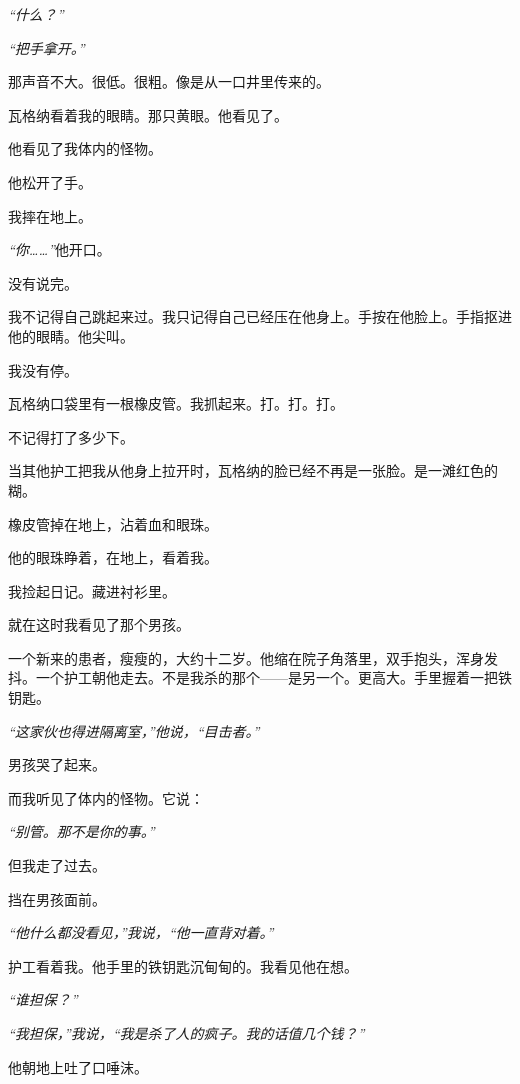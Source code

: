\noindent \textit{“什么？”}

\noindent \textit{“把手拿开。”}

\noindent 那声音不大。很低。很粗。像是从一口井里传来的。

\noindent 瓦格纳看着我的眼睛。那只黄眼。他看见了。

\noindent 他看见了我体内的怪物。

\noindent 他松开了手。

\noindent 我摔在地上。

\noindent \textit{“你……”}他开口。

\noindent 没有说完。

\noindent 我不记得自己跳起来过。我只记得自己已经压在他身上。手按在他脸上。手指抠进他的眼睛。他尖叫。

\noindent 我没有停。

\noindent 瓦格纳口袋里有一根橡皮管。我抓起来。打。打。打。

\noindent 不记得打了多少下。

\noindent 当其他护工把我从他身上拉开时，瓦格纳的脸已经不再是一张脸。是一滩红色的糊。

\noindent 橡皮管掉在地上，沾着血和眼珠。

\noindent 他的眼珠睁着，在地上，看着我。

\noindent 我捡起日记。藏进衬衫里。

\noindent 就在这时我看见了那个男孩。

\noindent 一个新来的患者，瘦瘦的，大约十二岁。他缩在院子角落里，双手抱头，浑身发抖。一个护工朝他走去。不是我杀的那个——是另一个。更高大。手里握着一把铁钥匙。

\noindent \textit{“这家伙也得进隔离室，”他说，“目击者。”}

\noindent 男孩哭了起来。

\noindent 而我听见了体内的怪物。它说：

\noindent \textit{“别管。那不是你的事。”}

\noindent 但我走了过去。

\noindent 挡在男孩面前。

\noindent \textit{“他什么都没看见，”我说，“他一直背对着。”}

\noindent 护工看着我。他手里的铁钥匙沉甸甸的。我看见他在想。

\noindent \textit{“谁担保？”}

\noindent \textit{“我担保，”我说，“我是杀了人的疯子。我的话值几个钱？”}

\noindent 他朝地上吐了口唾沫。

